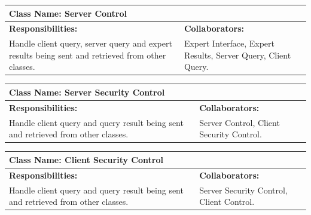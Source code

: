 \documentclass[]{article}
\begin{document}
\begin{enumerate}[a)]
\begin{table}[ht]
\begin{tabular}{|p{5cm}|p{5cm}|}
		\hline				
		\end{tabular}
	\end{table}

\begin{table}[ht]
		\centering
		\begin{tabular}{|p{5cm}|p{5cm}|}
		\hline 
		 \multicolumn{2}{|l|}{\textbf{Class Name: Server Control}} \\
		\hline
		\textbf{Responsibilities: } & \textbf{Collaborators:} \\
		\hline
		Handle client query, server query and expert results being sent and retrieved from other classes.	
		\vspace{1in} & Expert Interface, Expert Results, Server Query, Client Query.\\
		
		\hline				
		\end{tabular}
	\end{table}

\begin{table}[ht]
		\centering
		\begin{tabular}{|p{5cm}|p{5cm}|}
		\hline 
		 \multicolumn{2}{|l|}{\textbf{Class Name: Server Security Control}} \\
		\hline
		\textbf{Responsibilities: } & \textbf{Collaborators:} \\
		\hline
		Handle client query and query result being sent and retrieved from other classes.	
		\vspace{1in} & Server Control, Client Security Control.\\
		
		\hline				
		\end{tabular}
	\end{table}

\begin{table}[ht]
		\centering
		\begin{tabular}{|p{5cm}|p{5cm}|}
		\hline 
		 \multicolumn{2}{|l|}{\textbf{Class Name: Client Security Control}} \\
		\hline
		\textbf{Responsibilities: } & \textbf{Collaborators:} \\
		\hline
		Handle client query and query result being sent and retrieved from other classes.	
		\vspace{1in} & Server Security Control, Client Control.\\
		
		\hline				
		\end{tabular}
	\end{table}


\end{enumerate}
\end{document}
